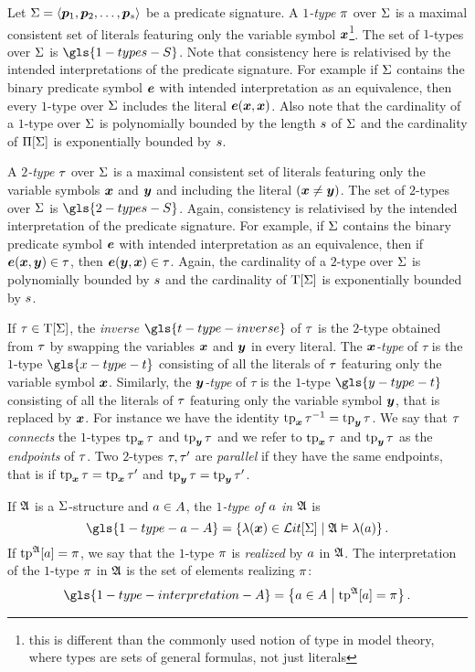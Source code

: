 Let $\mathrm{\Sigma} = \left\langle \bm{p}_{1}, \bm{p}_{2}, \dots, \bm{p}_{s} \right\rangle$ be a predicate signature.
A \emph{$1$-type} $\pi$ over $\mathrm{\Sigma}$ is a maximal consistent set of literals
featuring only the variable symbol $\bm{x}$\footnote{this is different than the
commonly used notion of type in model theory, where types are sets of general
formulas, not just literals}.
The set of $1$-types over $\mathrm{\Sigma}$ is $\gls{1-types-S}$.
Note that consistency here is relativised by the intended interpretations of the
predicate signature. For example if $\mathrm{\Sigma}$ contains the binary predicate symbol
$\bm{e}$ with intended interpretation as an equivalence, then every $1$-type over
$\mathrm{\Sigma}$ includes the literal $\bm{e}(\bm{x},\bm{x})$.
Also note that the cardinality of a $1$-type over $\mathrm{\Sigma}$ is polynomially
bounded by the length $s$ of $\mathrm{\Sigma}$ and the cardinality of $\Pi[\mathrm{\Sigma}]$ is
exponentially bounded by $s$.

A \emph{$2$-type} $\tau$ over $\mathrm{\Sigma}$ is a maximal consistent set of literals
featuring only the variable symbols $\bm{x}$ and $\bm{y}$ and including the literal
$(\bm{x} \neq \bm{y})$.
The set of $2$-types over $\mathrm{\Sigma}$ is $\gls{2-types-S}$.
Again, consistency is relativised by the intended interpretation of the
predicate signature.
For example, if $\mathrm{\Sigma}$ contains the binary predicate
symbol $\bm{e}$ with intended interpretation as an equivalence,
then if $\bm{e}(\bm{x}, \bm{y}) \in \tau$, then $\bm{e}(\bm{y}, \bm{x}) \in \tau$.
Again, the cardinality of a $2$-type over $\mathrm{\Sigma}$ is polynomially bounded by
$s$ and the cardinality of $\mathrm{T}[\mathrm{\Sigma}]$ is exponentially bounded by
$s$.

If $\tau \in \mathrm{T}[\mathrm{\Sigma}]$, the \emph{inverse} $\gls{t-type-inverse}$ of $\tau$
is the $2$-type obtained from $\tau$ by
swapping the variables $\bm{x}$ and $\bm{y}$ in every literal.
The \emph{$\bm{x}$-type} of $\tau$ is the $1$-type $\gls{x-type-t}$
consisting of all the literals of $\tau$ featuring only the variable symbol
$\bm{x}$. Similarly, the \emph{$\bm{y}$-type} of $\tau$ is the $1$-type
$\gls{y-type-t}$ consisting of all the literals of $\tau$ featuring only the
variable symbol $\bm{y}$, that is replaced by $\bm{x}$.
For instance we have the identity $\operatorname{tp}_{\bm{x}}\tau^{-1} = \operatorname{tp}_{\bm{y}}\tau$.
We say that $\tau$ \emph{connects} the $1$-types $\operatorname{tp}_{\bm{x}}\tau$ and $\operatorname{tp}_{\bm{y}}\tau$
and we refer to $\operatorname{tp}_{\bm{x}}\tau$ and $\operatorname{tp}_{\bm{y}}\tau$ as the \emph{endpoints} of $\tau$.
Two $2$-types $\tau,{\tau'}$ are \emph{parallel} if they have the same
endpoints, that is if $\operatorname{tp}_{\bm{x}}\tau = \operatorname{tp}_{\bm{x}}{\tau'}$ and $\operatorname{tp}_{\bm{y}}\tau = \operatorname{tp}_{\bm{y}}{\tau'}$.

If $\mathfrak{A}$ is a $\mathrm{\Sigma}$-structure and $a \in A$, the
\emph{$1$-type of $a$ in $\mathfrak{A}$} is
\[
  \gls{1-type-a-A} = \setbd{\litl(\xx) \in \LitF\SigS}{\StrA \vDash \litl(\ea)}.
\]
If $\operatorname{tp}^{\mathfrak{A}}[a] = \pi$, we say that the $1$-type $\pi$ is \emph{realized}
by $a$ in $\mathfrak{A}$. The interpretation of the $1$-type $\pi$ in $\mathfrak{A}$ is
the set of elements realizing $\pi$:
\[
  \gls{1-type-interpretation-A} = \setbd{\ea \in \domA}{\tpIa\StrA\ea = \tpIp}.
\]

